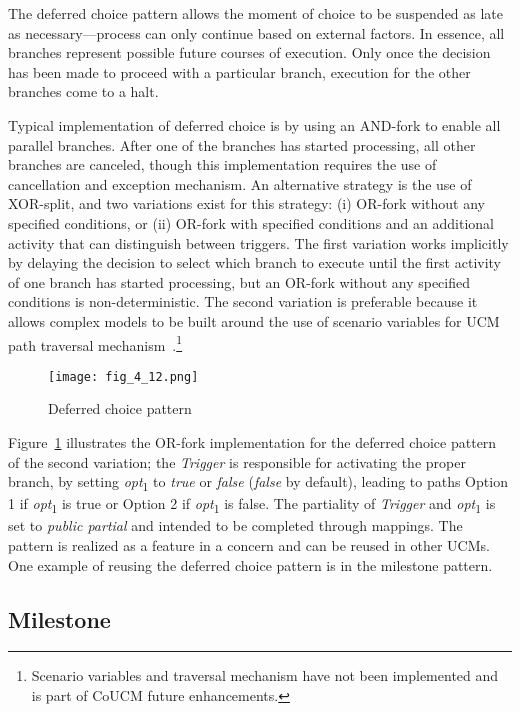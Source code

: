 The deferred choice pattern allows the moment of choice to be suspended as late as necessary---process can only continue based on external factors. In essence, all branches represent possible future courses of execution. Only once the decision has been made to proceed with a particular branch, execution for the other branches come to a halt. 

Typical implementation of deferred choice is by using an AND-fork to enable all parallel branches. After one of the branches has started processing, all other branches are canceled, though this implementation requires the use of cancellation and exception mechanism. An alternative strategy is the use of XOR-split, and two variations exist for this strategy: (i) OR-fork without any specified conditions, or (ii) OR-fork with specified conditions and an additional activity that can distinguish between triggers. The first variation works implicitly by delaying the decision to select which branch to execute until the first activity of one branch has started processing, but an OR-fork without any specified conditions is non-deterministic. The second variation is preferable because it allows complex models to be built around the use of scenario variables for UCM path traversal mechanism~\cite{kealey2007enhanced2}.\footnote{Scenario variables and traversal mechanism have not been implemented and is part of CoUCM future enhancements.}

\begin{figure}
	\centering
	\texttt{[image: fig\_4\_12.png]}
	\caption{Deferred choice pattern}
	\label{fig:4.12}
\end{figure}

Figure~\ref{fig:4.12} illustrates the OR-fork implementation for the deferred choice pattern of the second variation; the \emph{Trigger} is responsible for activating the proper branch, by setting \emph{opt}\textsubscript{1} to \emph{true} or \emph{false} (\emph{false} by default), leading to paths Option 1 if \emph{opt}\textsubscript{1} is true or Option 2 if \emph{opt}\textsubscript{1} is false. The partiality of \emph{Trigger} and \emph{opt}\textsubscript{1} is set to \emph{public partial} and intended to be completed through mappings. The pattern is realized as a feature in a concern and can be reused in other UCMs. One example of reusing the deferred choice pattern is in the milestone pattern.

\subsection{Milestone}

